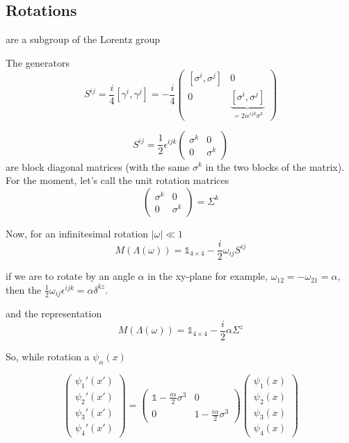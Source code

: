 \documentclass[11pt]{article}
\begin{document}
	
	\subsection*{Rotations}
	are a subgroup of the Lorentz group
	
	The generators \[ S^{ij} = \frac{i}{4} [\gamma^i, \gamma^j] = - \frac{i}{4} \begin{pmatrix}
		[\sigma^i, \sigma^j] & 0 \\
		0 & \underbrace{[\sigma^i, \sigma^j]}_{=2i\epsilon^{ijk}\sigma^k}
	\end{pmatrix}\]

		\[ S^{ij} = \frac{1}{2} \epsilon^{ijk} \begin{pmatrix}
			\sigma^k & 0 \\
			0 & \sigma^k
		\end{pmatrix}\]
	are block diagonal matrices (with the same $\sigma^k$ in the two blocks of the matrix).\\
	
	For the moment, let's call the unit rotation matrices \[\begin{pmatrix}
		\sigma^k & 0 \\ 0 & \sigma^k
	\end{pmatrix} = \Sigma^k \]

		Now, for an infinitesimal rotation $|\omega| \ll 1$
		 \[ M(\Lambda(\omega)) = \mathbb{1}_{4 \times 4} - \frac{i}{2}\omega_{ij}S^{ij} \]
		 
		 
		if we are to rotate by an angle $\alpha$ in the xy-plane for example, $\omega_{12} =- \omega_{21} = \alpha$, then the $\frac{1}{2} \omega_{ij}\epsilon^{ijk} = \alpha \delta^{kz}$.
		
		and the representation \[ M(\Lambda(\omega)) = \mathbb{1}_{4\times 4} - \frac{i}{2} \alpha \Sigma^z\]
		
	So, while rotation a $\psi_\alpha(x)$
	
	\[ \begin{pmatrix}
		\psi_1'(x')\\ \psi_2'(x')\\ \psi_3'(x')\\ \psi_4'(x')
	\end{pmatrix} = \begin{pmatrix}
						\mathbb{1} - \frac{i\alpha}{2}\sigma^3 & 0 \\
						0 & 1 - \frac{i\alpha}{2} \sigma^3
					\end{pmatrix} \begin{pmatrix}
					\psi_1(x)\\ \psi_2(x)\\ \psi_3(x)\\ \psi_4(x)
				\end{pmatrix}\]
		 
\end{document}
